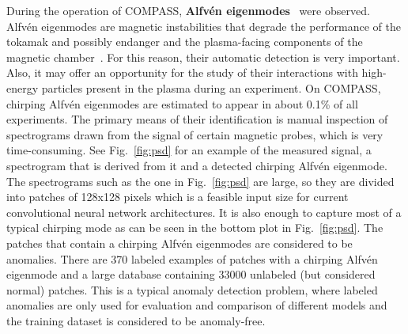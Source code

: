 During the operation of COMPASS, \textbf{Alfv\'en eigenmodes}~\cite{markovic2015alfven, melnikov2015quasicoherent, markovic2017alfven} were observed. Alfv\'en eigenmodes are magnetic instabilities that degrade the performance of the tokamak and possibly endanger and the plasma-facing components of the magnetic chamber~\cite{mett1992kinetic}. For this reason, their automatic detection is very important. Also, it may offer an opportunity for the study of their interactions with high-energy particles present in the plasma during an experiment. On COMPASS, chirping Alfv\'en eigenmodes are estimated to appear in about 0.1\% of all experiments. The primary means of their identification is manual inspection of spectrograms drawn from the signal of certain magnetic probes, which is very time-consuming. See Fig.~\ref{fig:psd} for an example of the measured signal, a spectrogram that is derived from it and a detected chirping Alfv\'en eigenmode. The spectrograms such as the one in Fig.~\ref{fig:psd} are large, so they are divided into patches of 128x128 pixels which is a feasible input size for current convolutional neural network architectures. It is also enough to capture most of a typical chirping mode as can be seen in the bottom plot in Fig.~\ref{fig:psd}. The patches that contain a chirping Alfv\'en eigenmodes are considered to be anomalies. There are 370 labeled examples of patches with a chirping Alfv\'en eigenmode and a large database containing 33000 unlabeled (but considered normal) patches. This is a typical anomaly detection problem, where labeled anomalies are only used for evaluation and comparison of different models and the training dataset is considered to be anomaly-free.


